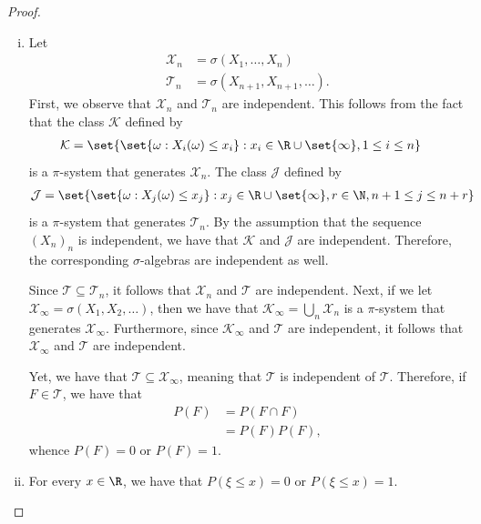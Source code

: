 \documentclass[10pt]{mypackage}
\begin{document}
\begin{proof}\hfill
  \begin{enumerate}[(i)]
    \item Let 
      \begin{align*}
        \mathcal{X}_n &= \sigma\left( X_1,\dots,X_n \right)\\
        \mathcal{T}_n &= \sigma\left( X_{n+1},X_{n+1},\dots \right).
      \end{align*}
      First, we observe that $\mathcal{X}_n$ and $\mathcal{T}_n$ are independent. This follows from the fact that the class $\mathcal{K}$ defined by
      \begin{align*}
        \mathcal{K} &= \set{\set{\omega: X_i(\omega)\leq x_i} : x_i\in \R\cup\set{\infty},1\leq i \leq n}
      \end{align*}
      is a $\pi$-system that generates $\mathcal{X}_n$. The class $\mathcal{J}$ defined by
      \begin{align*}
        \mathcal{J} &= \set{\set{\omega : X_j(\omega) \leq x_j} : x_j\in \R\cup\set{\infty},r\in \N,n+1\leq j \leq n+r}
      \end{align*}
      is a $\pi$-system that generates $\mathcal{T}_n$. By the assumption that the sequence $\left( X_n \right)_n$ is independent, we have that $\mathcal{K}$ and $\mathcal{J}$ are independent. Therefore, the corresponding $\sigma$-algebras are independent as well.

      Since $\mathcal{T}\subseteq \mathcal{T}_n$, it follows that $\mathcal{X}_n$ and $\mathcal{T}$ are independent. Next, if we let $\mathcal{X}_{\infty} = \sigma\left( X_1,X_2,\dots \right)$, then we have that $\mathcal{K}_{\infty} = \bigcup_{n}\mathcal{X}_n$ is a $\pi$-system that generates $\mathcal{X}_{\infty}$. Furthermore, since $\mathcal{K}_{\infty}$ and $\mathcal{T}$ are independent, it follows that $\mathcal{X}_{\infty}$ and $\mathcal{T}$ are independent.

      Yet, we have that $ \mathcal{T}\subseteq \mathcal{X}_{\infty} $, meaning that $\mathcal{T}$ is independent of $\mathcal{T}$. Therefore, if $F\in \mathcal{T}$, we have that
      \begin{align*}
        P(F) &= P\left( F\cap F \right)\\
             &= P(F)P(F),
      \end{align*}
      whence $P(F) = 0$ or $P(F) = 1$.
    \item For every $x\in \R$, we have that $P\left( \xi\leq x \right) = 0$ or $P\left( \xi\leq x \right) = 1$.


\end{enumerate}
\end{proof}
\end{document}
